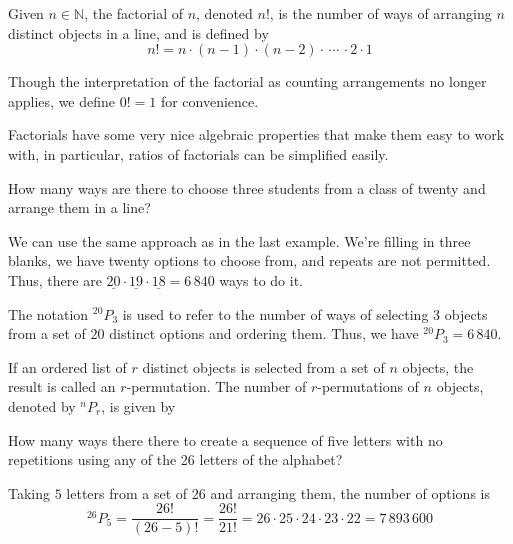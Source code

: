 \par
\begin{defn}
Given $n \in \mathbb{N}$, the factorial of $n$, denoted $n!$, is the number of ways of arranging $n$ distinct objects in a line, and is defined by
$$n! = n \cdot (n-1) \cdot (n-2) \cdot \, \cdots \, \cdot 2 \cdot 1$$
\end{defn}
\begin{rmk} Though the interpretation of the factorial as counting arrangements no longer applies, we define $0!=1$ for convenience.
\end{rmk}
\par Factorials have some very nice algebraic properties that make them easy to work with, in particular, ratios of factorials can be simplified easily.
\par
\begin{examp}
How many ways are there to choose three students from a class of twenty and arrange them in a line?
\par
\noindent We can use the same approach as in the last example. We're filling in three blanks, we have twenty options to choose from, and repeats are not permitted. Thus, there are $\underline{20} \cdot \underline{19} \cdot \underline{18} = 6\,840$ ways to do it. 
\par
\noindent The notation $^{20}P_3$ is used to refer to the number of ways of selecting $3$ objects from a set of $20$ distinct options and ordering them. Thus, we have $^{20}P_3 = 6\,840$.
\end{examp}
\par
\begin{definition}\label{permutationdefinition}
If an ordered list of $r$ distinct objects is selected from a set of $n$ objects, the result is called an $r$-permutation. The number of $r$-permutations of $n$ objects, denoted by $^{n}P_r$, is given by
\end{definition}
\par
\begin{examp}
How many ways there there to create a sequence of five letters with no repetitions using any of the 26 letters of the alphabet?
\par
\noindent Taking $5$ letters from a set of $26$ and arranging them, the number of options is
$$^{26}P_5 = \frac{26!}{(26-5)!} = \frac{26!}{21!} = 26 \cdot 25 \cdot 24 \cdot 23 \cdot 22 = 7\,893\,600$$
\end{examp}

